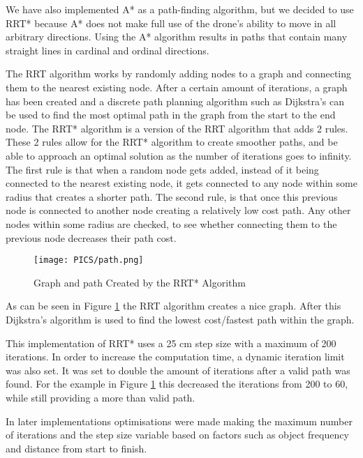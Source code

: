 \documentclass{article}
\begin{document}
We have also implemented A* as a path-finding algorithm, but we decided to use RRT* because A* does not make full use of the drone's ability to move in all arbitrary directions.
Using the A* algorithm results in paths that contain many straight lines in cardinal and ordinal directions.

The RRT algorithm works by randomly adding nodes to a graph and connecting them to the nearest existing node. After a certain amount of iterations, a graph has been created and a discrete path planning algorithm such as Dijkstra's can be used to find the most optimal path in the graph from the start to the end node.
The RRT* algorithm is a version of the RRT algorithm that adds 2 rules. These 2 rules allow for the RRT* algorithm to create smoother paths, and be able to approach an optimal solution as the number of iterations goes to infinity.
The first rule is that when a random node gets added, instead of it being connected to the nearest existing node, it gets connected to any node within some radius that creates a shorter path.
The second rule, is that once this previous node is connected to another node creating a relatively low cost path. Any other nodes within some radius are checked, to see whether connecting them to the previous node decreases their path cost.

\begin{figure}[H]
\centering
\texttt{[image: PICS/path.png]}
\caption{\label{fig:graph}Graph and path Created by the RRT* Algorithm}
\end{figure}

As can be seen in Figure \ref{fig:graph} the RRT algorithm creates a nice graph. After this Dijkstra's algorithm is used to find the lowest cost/fastest path within the graph.

This implementation of RRT* uses a 25 cm step size with a maximum of 200 iterations. In order to increase the computation time, a dynamic iteration limit was also set. It was set to double the amount of iterations after a valid path was found. For the example in Figure \ref{fig:graph} this decreased the iterations from 200 to 60, while still providing a more than valid path.

In later implementations optimisations were made making the maximum number of iterations and the step size variable based on factors such as object frequency and distance from start to finish.
\end{document}
